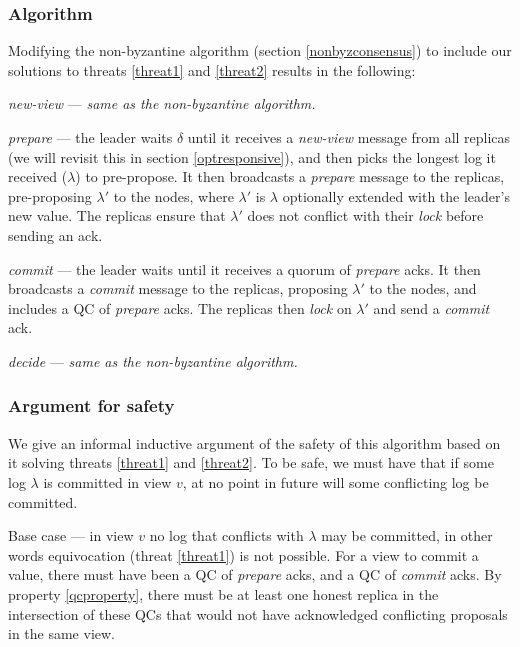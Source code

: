 \subsubsection{Algorithm}
Modifying the non-byzantine algorithm (section \ref{nonbyzconsensus}) to include our solutions to threats \ref{threat1} and \ref{threat2} results in the following:

\begin{description}
	\item \textit{new-view} --- \textit{same as the non-byzantine algorithm.}
	\item \textit{prepare} --- the leader waits $\delta$ until it receives a \textit{new-view} message from all replicas (we will revisit this in section \ref{optresponsive}), and then picks the longest log it received ($\lambda$) to pre-propose. It then broadcasts a \textit{prepare} message to the replicas, pre-proposing $\lambda'$ to the nodes, where $\lambda'$ is $\lambda$ optionally extended with the leader's new value. The replicas ensure that $\lambda'$ does not conflict with their \textit{lock} before sending an ack.
	\item \textit{commit} --- the leader waits until it receives a quorum of \textit{prepare} acks. It then broadcasts a \textit{commit} message to the replicas, proposing $\lambda'$ to the nodes, and includes a QC of \textit{prepare} acks. The replicas then \textit{lock} on $\lambda'$ and send a \textit{commit} ack.
	\item \textit{decide} --- \textit{same as the non-byzantine algorithm.}
\end{description}

\subsubsection{Argument for safety}
We give an informal inductive argument of the safety of this algorithm based on it solving threats \ref{threat1} and \ref{threat2}. To be safe, we must have that if some log $\lambda$ is committed in view $v$, at no point in future will some conflicting log be committed.

Base case --- in view $v$ no log that conflicts with $\lambda$ may be committed, in other words equivocation (threat \ref{threat1}) is not possible. For a view to commit a value, there must have been a QC of \textit{prepare} acks, and a QC of \textit{commit} acks. By property \ref{qcproperty}, there must be at least one honest replica in the intersection of these QCs that would not have acknowledged conflicting proposals in the same view.

